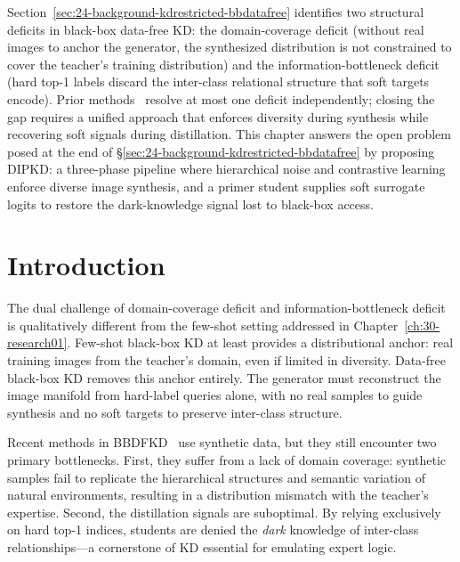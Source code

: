 \documentclass[12pt, a4paper, twoside]{book}
\numberwithin{equation}{chapter}
\theoremstyle{plain}
\theoremstyle{definition}
\theoremstyle{remark}
\newenvironment{foldable}{}{}
\begin{document}
\begin{foldable}
  Section~\ref{sec:24-background-kdrestricted-bbdatafree} identifies two structural deficits in black-box data-free \ac{KD}: the domain-coverage deficit (without real images to anchor the generator, the synthesized distribution is not constrained to cover the teacher's training distribution) and the information-bottleneck deficit (hard top-1 labels discard the inter-class relational structure that soft targets encode).
  Prior methods~\cite{wang2021zero, zhang2022ideal, yuan2024data} resolve at most one deficit independently; closing the gap requires a unified approach that enforces diversity during synthesis while recovering soft signals during distillation.
  This chapter answers the open problem posed at the end of \S\ref{sec:24-background-kdrestricted-bbdatafree} by proposing \acl{DIPKD}: a three-phase pipeline where hierarchical noise and contrastive learning enforce diverse image synthesis, and a primer student supplies soft surrogate logits to restore the dark-knowledge signal lost to black-box access.
\end{foldable}

\section{Introduction} \label{sec:41-research02-introduction}

\begin{foldable}
  The dual challenge of domain-coverage deficit and information-bottleneck deficit is qualitatively different from the few-shot setting addressed in Chapter~\ref{ch:30-research01}.
  Few-shot black-box \ac{KD} at least provides a distributional anchor: real training images from the teacher's domain, even if limited in diversity.
  Data-free black-box \ac{KD} removes this anchor entirely.
  The generator must reconstruct the image manifold from hard-label queries alone, with no real samples to guide synthesis and no soft targets to preserve inter-class structure.
\end{foldable}

\begin{foldable} Recent methods in BBDFKD~\cite{wang2021zero,zhang2022ideal,yuan2024data} use synthetic data, but they still encounter two primary bottlenecks.
  First, they suffer from a lack of domain coverage: synthetic samples fail to replicate the hierarchical structures and semantic variation of natural environments, resulting in a distribution mismatch with the teacher's expertise.
  Second, the distillation signals are suboptimal.
  By relying exclusively on hard top-1 indices, students are denied the \textit{dark} knowledge of inter-class relationships---a cornerstone of \ac{KD} essential for emulating expert logic.
\end{foldable}
\end{document}
